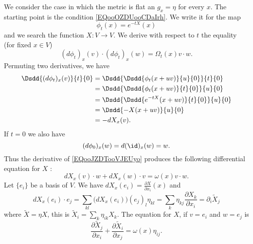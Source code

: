 We consider the case in which the metric is flat an \( g_x=\eta\) for every \( x\).  The starting point is the condition \eqref{EQooOZDUooCDaIrh}. We write it for the map
\begin{equation}
    \phi_t(x)= e^{-tX}(x)
\end{equation}
and we search the function \( X\colon V\to V\). We derive with respect to \( t\) the equality (for fixed \( x\in V\))
\begin{equation}        \label{EQooJZDTooVJEUyo}
    (d\phi_t)_x(v)\cdot (d\phi_t)_x(w)=\Omega_t(x)v\cdot w.
\end{equation}
Permuting two derivatives, we have
\begin{subequations}
    \begin{align}
        \Dsdd{ (d\phi_t)_x(v) }{t}{0}&=\Dsdd{ \Dsdd{   \phi_t(x+uv)  }{u}{0} }{t}{0}\\
        &=\Dsdd{\Dsdd{ \phi_t(x+uv) }{t}{0} }{u}{0}\\
        &=\Dsdd{ \Dsdd{  e^{-tX}(x+uv) }{t}{0} }{u}{0}\\
        &=\Dsdd{ -X(x+uv) }{u}{0}\\
        &=-dX_x(v).
    \end{align}
\end{subequations}
If \( t=0\) we also have
\begin{equation}
    (d\phi_0)_x(w)=d(\id)_x(w)=w.
\end{equation}
Thus the derivative of \eqref{EQooJZDTooVJEUyo} produces the following differential equation for \( X\) :
\begin{equation}
    dX_x(v)\cdot w+dX_x(w)\cdot v=\omega(x)v\cdot w.
\end{equation}
Let \( \{ e_i \}\) be a basis of \( V\). We have \( dX_x(e_i)=\frac{ \partial X }{ \partial x_i }(x)\) and
\begin{equation}
    dX_x(e_i)\cdot e_j=\sum_{kl}\big( dX_x(e_i) \big)(e_j)_l\eta_{kl}=\sum_k\eta_{kj}\frac{ \partial X_k }{ \partial x_i }=\partial_i\tilde X_j
\end{equation}
where \( \tilde X=\eta X\), this is \( \tilde X_i=\sum_k\eta_{ik}X_k\). The equation for \( X\), if \( v=e_i\) and \( w=e_j\) is
\begin{equation}
    \frac{ \partial \tilde X_j }{ \partial x_i }+\frac{ \partial \tilde X_i }{ \partial x_j }=\omega(x)\eta_{ij}.
\end{equation}

